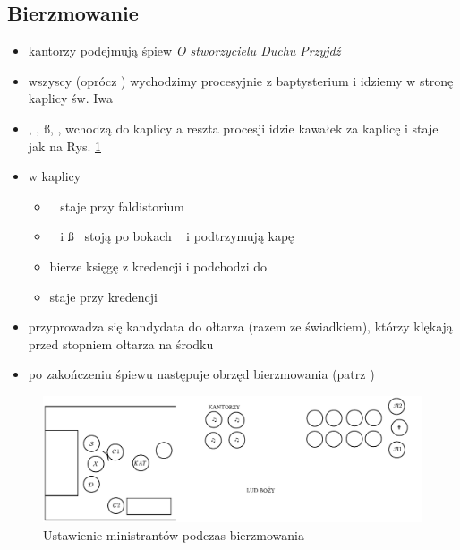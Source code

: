 \subsection{Bierzmowanie}
\begin{itemize}
	\item kantorzy podejmują śpiew \textit{O stworzycielu Duchu Przyjdź}
	\item wszyscy (oprócz \paschal) wychodzimy procesyjnie z baptysterium i
	      idziemy w stronę kaplicy św. Iwa
	\item \ii, \dd, \ss, ,  wchodzą do kaplicy a reszta procesji idzie
	      kawałek za kaplicę i staje jak na Rys. \ref{fig:bierzmowania}
	\item w kaplicy
	      \begin{itemize}
		      \item \ii~ staje przy faldistorium
		      \item \dd~ i \ss~ stoją po bokach \ii~ i podtrzymują kapę
		      \item {} bierze księgę z kredencji i podchodzi do \ii~
		      \item {} staje przy kredencji
	      \end{itemize}
	\item przyprowadza się kandydata do ołtarza (razem ze świadkiem), którzy
	      klękają przed stopniem ołtarza na środku
	\item po zakończeniu śpiewu następuje obrzęd bierzmowania (patrz
	      \textit{})
\end{itemize}
\begin{figure}[H]
	\centering
	\includegraphics[width=\linewidth]{Figures/Iwo.pdf}
	\caption{Ustawienie ministrantów podczas bierzmowania}
	\label{fig:bierzmowania}
\end{figure}
